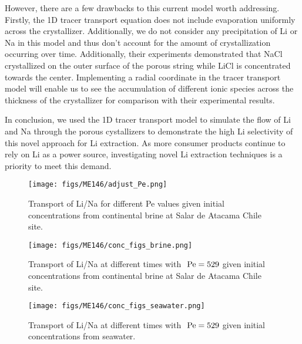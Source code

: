 \documentclass{article}
\begin{document}
However, there are a few drawbacks to this current model worth addressing. Firstly, the 1D tracer transport equation does not include evaporation uniformly across the crystallizer. Additionally, we do not consider any precipitation of Li or Na in this model and thus don't account for the amount of crystallization occurring over time. Additionally, their experiments demonstrated that NaCl crystallized on the outer surface of the porous string while LiCl is concentrated towards the center. Implementing a radial coordinate in the tracer transport model will enable us to see the accumulation of different ionic species across the thickness of the crystallizer for comparison with their experimental results. 

In conclusion, we used the 1D tracer transport model to simulate the flow of Li and Na through the porous cystallizers to demonstrate the high Li selectivity of this novel approach for Li extraction. As more consumer products continue to rely on Li as a power source, investigating novel Li extraction techniques is a priority to meet this demand. 

\begin{figure}[h]
    \centering
    \texttt{[image: figs/ME146/adjust\_Pe.png]}
    \caption{Transport of Li/Na for different Pe values given initial concentrations from continental brine at Salar de Atacama Chile site.}
    \label{fig:adjust_PE}
\end{figure}

\begin{figure}[h]
    \centering
    \texttt{[image: figs/ME146/conc\_figs\_brine.png]}
    \caption{Transport of Li/Na at different times with $\rm~Pe =529$ given initial concentrations from continental brine at Salar de Atacama Chile site.}
    \label{fig:brine}
\end{figure}

\begin{figure}[h]
    \centering
    \texttt{[image: figs/ME146/conc\_figs\_seawater.png]}
    \caption{Transport of Li/Na at different times with $\rm~Pe =529$ given initial concentrations from seawater.}
    \label{fig:sea}
\end{figure}








\clearpage
\printbibliography
%
\end{document}
